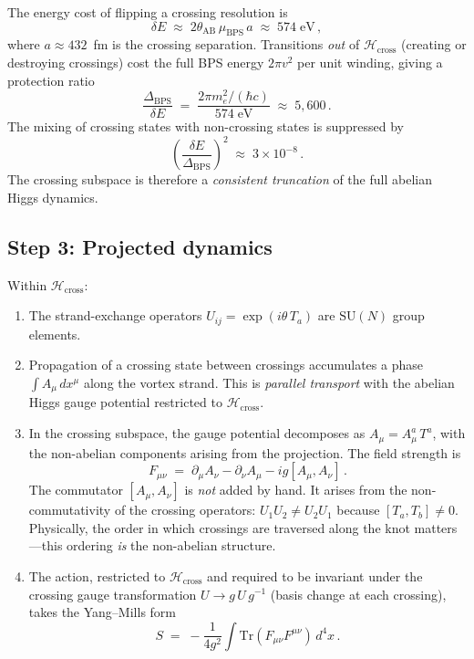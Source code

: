 \documentclass[11pt]{article}
\newcommand{\Tr}{\mathrm{Tr}}
\begin{document}
The energy cost of flipping a crossing resolution is
\begin{equation}
\delta E \;\approx\; 2\theta_\text{AB}\,\mu_\text{BPS}\,a
    \;\approx\; 574\;\text{eV}\,,
\end{equation}
where $a \approx 432$~fm is the crossing separation.  Transitions
\emph{out} of $\mathcal{H}_\text{cross}$ (creating or destroying
crossings) cost the full BPS energy $2\pi v^2$ per unit winding,
giving a protection ratio
\begin{equation}
\frac{\Delta_\text{BPS}}{\delta E}
    \;=\; \frac{2\pi m_e^2/(\hbar c)}{574\;\text{eV}}
    \;\approx\; 5{,}600\,.
\end{equation}
The mixing of crossing states with non-crossing states is suppressed
by
\begin{equation}
\left(\frac{\delta E}{\Delta_\text{BPS}}\right)^{\!2}
    \;\approx\; 3 \times 10^{-8}\,.
\label{eq:protection}
\end{equation}
The crossing subspace is therefore a \emph{consistent truncation} of
the full abelian Higgs dynamics.

\subsection{Step 3: Projected dynamics}

Within $\mathcal{H}_\text{cross}$:
\begin{enumerate}
\item[(a)] The strand-exchange operators $U_{ij} =
      \exp(i\theta\,T_a)$ are $\mathrm{SU}(N)$ group elements.
\item[(b)] Propagation of a crossing state between crossings
      accumulates a phase $\int A_\mu\,dx^\mu$ along the vortex
      strand.  This is \emph{parallel transport} with the abelian
      Higgs gauge potential restricted to
      $\mathcal{H}_\text{cross}$.
\item[(c)] In the crossing subspace, the gauge potential decomposes
      as $A_\mu = A_\mu^a\,T^a$, with the non-abelian components
      arising from the projection.  The field strength is
      \begin{equation}
      \boxed{\;
      F_{\mu\nu} \;=\; \partial_\mu A_\nu - \partial_\nu A_\mu
          - ig[A_\mu, A_\nu]\,.
      \;}
      \label{eq:field_strength}
      \end{equation}
      The commutator $[A_\mu, A_\nu]$ is \emph{not} added by hand.
      It arises from the non-commutativity of the crossing operators:
      $U_1 U_2 \neq U_2 U_1$ because $[T_a, T_b] \neq 0$.
      Physically, the order in which crossings are traversed along
      the knot matters---this ordering \emph{is} the non-abelian
      structure.
\item[(d)] The action, restricted to $\mathcal{H}_\text{cross}$ and
      required to be invariant under the crossing gauge transformation
      $U \to g\,U\,g^{-1}$ (basis change at each crossing), takes
      the Yang--Mills form
      \begin{equation}
      S \;=\; -\frac{1}{4g^2}\int \Tr(F_{\mu\nu}F^{\mu\nu})\,d^4x\,.
      \label{eq:yang_mills}
      \end{equation}
\end{enumerate}
\end{document}
